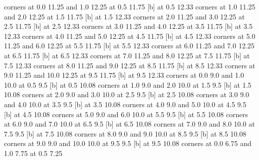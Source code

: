 \putrectangle corners at 0.0 11.25 and 1.0 12.25
 at 0.5 11.75
 [b] at 0.5 12.33
\putrectangle corners at 1.0 11.25 and 2.0 12.25
 at 1.5 11.75
 [b] at 1.5 12.33
\putrectangle corners at 2.0 11.25 and 3.0 12.25
 at 2.5 11.75
 [b] at 2.5 12.33
\putrectangle corners at 3.0 11.25 and 4.0 12.25
 at 3.5 11.75
 [b] at 3.5 12.33
\putrectangle corners at 4.0 11.25 and 5.0 12.25
 at 4.5 11.75
 [b] at 4.5 12.33
\putrectangle corners at 5.0 11.25 and 6.0 12.25
 at 5.5 11.75
 [b] at 5.5 12.33
\putrectangle corners at 6.0 11.25 and 7.0 12.25
 at 6.5 11.75
 [b] at 6.5 12.33
\putrectangle corners at 7.0 11.25 and 8.0 12.25
 at 7.5 11.75
 [b] at 7.5 12.33
\putrectangle corners at 8.0 11.25 and 9.0 12.25
 at 8.5 11.75
 [b] at 8.5 12.33
\putrectangle corners at 9.0 11.25 and 10.0 12.25
 at 9.5 11.75
 [b] at 9.5 12.33
\putrectangle corners at 0.0 9.0 and 1.0 10.0
 at 0.5 9.5
 [b] at 0.5 10.08
\putrectangle corners at 1.0 9.0 and 2.0 10.0
 at 1.5 9.5
 [b] at 1.5 10.08
\putrectangle corners at 2.0 9.0 and 3.0 10.0
 at 2.5 9.5
 [b] at 2.5 10.08
\putrectangle corners at 3.0 9.0 and 4.0 10.0
 at 3.5 9.5
 [b] at 3.5 10.08
\putrectangle corners at 4.0 9.0 and 5.0 10.0
 at 4.5 9.5
 [b] at 4.5 10.08
\putrectangle corners at 5.0 9.0 and 6.0 10.0
 at 5.5 9.5
 [b] at 5.5 10.08
\putrectangle corners at 6.0 9.0 and 7.0 10.0
 at 6.5 9.5
 [b] at 6.5 10.08
\putrectangle corners at 7.0 9.0 and 8.0 10.0
 at 7.5 9.5
 [b] at 7.5 10.08
\putrectangle corners at 8.0 9.0 and 9.0 10.0
 at 8.5 9.5
 [b] at 8.5 10.08
\putrectangle corners at 9.0 9.0 and 10.0 10.0
 at 9.5 9.5
 [b] at 9.5 10.08
\putrectangle corners at 0.0 6.75 and 1.0 7.75
 at 0.5 7.25
